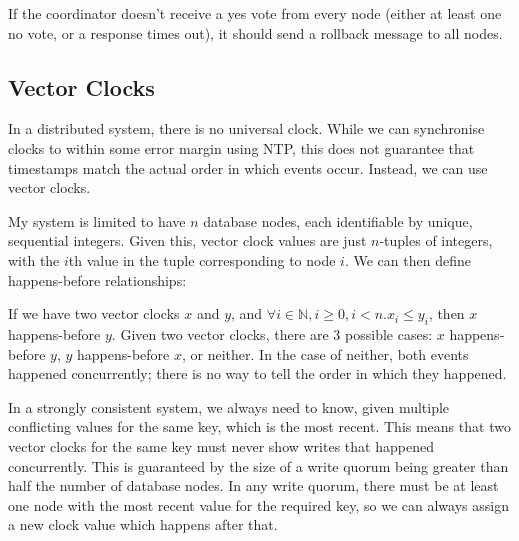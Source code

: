 \documentclass[12pt,a4paper]{article}
\begin{document}
If the coordinator doesn't receive a yes vote from every node (either at least one no vote, or a response times out), it should send a rollback message to all nodes.

\subsection*{Vector Clocks}

In a distributed system, there is no universal clock. While we can synchronise clocks to within some error margin using NTP, this does not guarantee that timestamps match the actual order in which events occur. Instead, we can use vector clocks.

My system is limited to have $n$ database nodes, each identifiable by unique, sequential integers. Given this, vector clock values are just $n$-tuples of integers, with the $i$th value in the tuple corresponding to node $i$. We can then define happens-before relationships:

If we have two vector clocks $x$ and $y$, and $\forall i \in \mathbb{N}, i \geq 0, i < n . x_i \leq y_i$, then $x$ happens-before $y$. Given two vector clocks, there are 3 possible cases: $x$ happens-before $y$, $y$ happens-before $x$, or neither. In the case of neither, both events happened concurrently; there is no way to tell the order in which they happened.

In a strongly consistent system, we always need to know, given multiple conflicting values for the same key, which is the most recent. This means that two vector clocks for the same key must never show writes that happened concurrently. This is guaranteed by the size of a write quorum being greater than half the number of database nodes. In any write quorum, there must be at least one node with the most recent value for the required key, so we can always assign a new clock value which happens after that.
\end{document}
